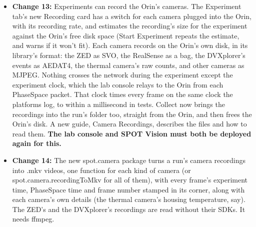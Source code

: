 \documentclass[11pt]{article}
\begin{document}
\begin{itemize}[label={\textcolor{primaryColor}{\textbullet}}]
    \item \textbf{Change 13:} Experiments can record the Orin's cameras. The Experiment tab's new Recording card has a switch for each camera plugged into the Orin, with its recording rate, and estimates the recording's size for the experiment against the Orin's free disk space (Start Experiment repeats the estimate, and warns if it won't fit). Each camera records on the Orin's own disk, in its library's format: the ZED as SVO, the RealSense as a bag, the DVXplorer's events as AEDAT4, the thermal camera's raw counts, and other cameras as MJPEG. Nothing crosses the network during the experiment except the experiment clock, which the lab console relays to the Orin from each PhaseSpace packet. That clock times every frame on the same clock the platforms log, to within a millisecond in tests. Collect now brings the recordings into the run's folder too, straight from the Orin, and then frees the Orin's disk. A new guide, Camera Recordings, describes the files and how to read them. \textbf{The lab console and SPOT Vision must both be deployed again for this.}
    \item \textbf{Change 14:} The new spot.camera package turns a run's camera recordings into .mkv videos, one function for each kind of camera (or spot.camera.recordingToMkv for all of them), with every frame's experiment time, PhaseSpace time and frame number stamped in its corner, along with each camera's own details (the thermal camera's housing temperature, say). The ZED's and the DVXplorer's recordings are read without their SDKs. It needs ffmpeg.
\end{itemize}

\end{document}
